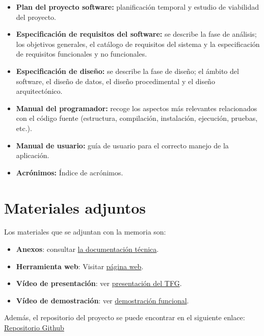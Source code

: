 \begin{itemize}
\tightlist
\item
  \textbf{Plan del proyecto software:} planificación temporal y estudio
  de viabilidad del proyecto.
\item
  \textbf{Especificación de requisitos del software:} se describe la
  fase de análisis; los objetivos generales, el catálogo de requisitos
  del sistema y la especificación de requisitos funcionales y no
  funcionales.
\item
  \textbf{Especificación de diseño:} se describe la fase de diseño; el
  ámbito del software, el diseño de datos, el diseño procedimental y el
  diseño arquitectónico.
\item
  \textbf{Manual del programador:} recoge los aspectos más relevantes
  relacionados con el código fuente (estructura, compilación,
  instalación, ejecución, pruebas, etc.).
\item
  \textbf{Manual de usuario:} guía de usuario para el correcto manejo de
  la aplicación.
\item 
    \textbf{Acrónimos: }Índice de acrónimos.
  
\end{itemize}


\section{Materiales adjuntos}\label{materiales-adjuntos}

Los materiales que se adjuntan con la memoria son: 

\begin{itemize}
\item
	\textbf{Anexos}: consultar \href{https://github.com/mariolopezmatamala/cloud-duo-aws-gcp/tree/main/docs}{la documentación técnica}.
\item
	\textbf{Herramienta web}: Visitar \href{https://aws-gcp-chatbot-webapp.s3.amazonaws.com/index.html}{página web}.
\item	
	\textbf{Vídeo de presentación}: ver \href{https://universidaddeburgos-my.sharepoint.com/:v:/g/personal/mlm1015_alu_ubu_es/EZUBowfELs1ErHR5M7LZcmIBCe4Ju__J7FfReeBi433LWw?nav=eyJyZWZlcnJhbEluZm8iOnsicmVmZXJyYWxBcHAiOiJPbmVEcml2ZUZvckJ1c2luZXNzIiwicmVmZXJyYWxBcHBQbGF0Zm9ybSI6IldlYiIsInJlZmVycmFsTW9kZSI6InZpZXciLCJyZWZlcnJhbFZpZXciOiJNeUZpbGVzTGlua0NvcHkifX0&e=NeUESc}{presentación del TFG}.
\item	
	\textbf{Vídeo de demostración}: ver \href{https://universidaddeburgos-my.sharepoint.com/:v:/g/personal/mlm1015_alu_ubu_es/EUD9pZr3b3lEoQsfxsr902wBeDKFWj2YQOVRoM7n-X9zYw?nav=eyJyZWZlcnJhbEluZm8iOnsicmVmZXJyYWxBcHAiOiJPbmVEcml2ZUZvckJ1c2luZXNzIiwicmVmZXJyYWxBcHBQbGF0Zm9ybSI6IldlYiIsInJlZmVycmFsTW9kZSI6InZpZXciLCJyZWZlcnJhbFZpZXciOiJNeUZpbGVzTGlua0NvcHkifX0&e=7a64oD}{demostración funcional}.
\end{itemize}

Además, el repositorio del proyecto se puede encontrar en el siguiente enlace: \href{https://github.com/mariolopezmatamala/cloud-duo-aws-gcp}{Repositorio Github}



